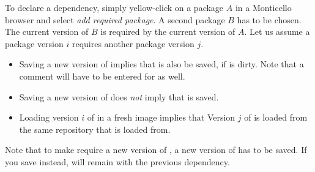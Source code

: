 \documentclass[a4paper,10pt,twoside]{book}
\begin{document}
To declare a dependency, simply yellow-click on a package $A$ in a Monticello browser and select \emph{add required package}. A second package $B$ has to be chosen. The current version of $B$ is required by the current version of $A$. Let us assume a package  version $i$ requires another package  version $j$.

\begin{itemize}
\item Saving a new version of  implies that  is also be saved, if  is dirty. Note that a comment will have to be entered for  as well.
\item Saving a new version of  does \emph{not} imply that  is saved.
\item Loading version $i$ of  in a fresh image implies that Version $j$ of  is loaded from the same repository that  is loaded from.  
\end{itemize}

Note that to make  require a new version of , a new version of  has to be saved. If you save  instead,  will remain with the previous dependency.





\end{document}
